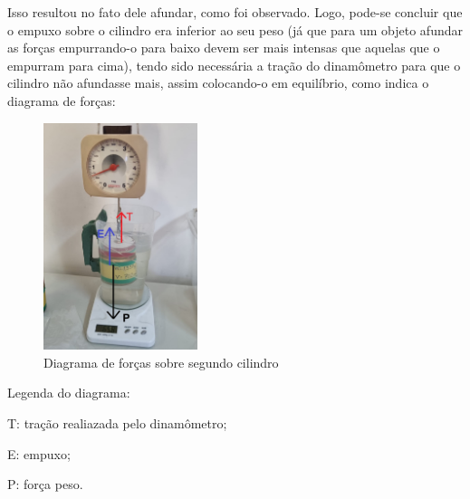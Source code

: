 Isso resultou no fato dele afundar, como foi observado. Logo, pode-se concluir que o empuxo sobre o cilindro era inferior ao seu peso (já que para um objeto afundar as forças empurrando-o para baixo devem ser mais intensas que aquelas que o empurram para cima), tendo sido necessária a tração do dinamômetro para que o cilindro não afundasse mais, assim colocando-o em equilíbrio, como indica o diagrama de forças:

\begin{figure}[H]
    \centering
    \includegraphics[width=0.4\textwidth]{fig/DiagramaDeForcas.jpeg}
    \caption{Diagrama de forças sobre segundo cilindro}
    \label{fig:diagramaForcas}
\end{figure}
Legenda do diagrama:

T: tração realiazada pelo dinamômetro;

E: empuxo;

P: força peso.
\\

